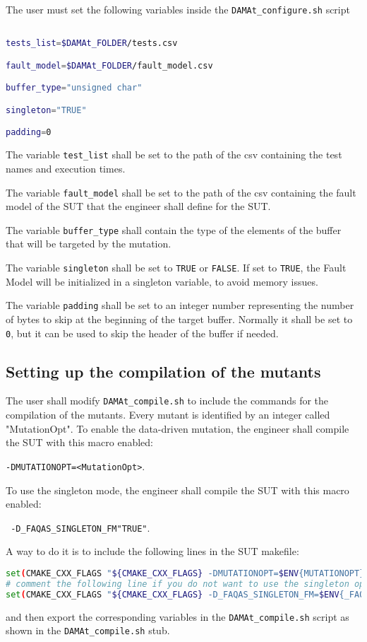 The user must set the following variables inside the \texttt{DAMAt\_configure.sh} script
\begin{lstlisting}[language=bash]

tests_list=$DAMAt_FOLDER/tests.csv

fault_model=$DAMAt_FOLDER/fault_model.csv

buffer_type="unsigned char"

singleton="TRUE"

padding=0

\end{lstlisting}

The variable \texttt{test\_list} shall be set to the path of the csv containing the test names and execution times.

The variable \texttt{fault\_model} shall be set to the path of the csv containing the fault model of the SUT that the engineer shall define for the SUT.

The variable \texttt{buffer\_type} shall contain the type of the elements of the buffer that will be targeted by the mutation.

The variable \texttt{singleton} shall be set to \texttt{TRUE} or \texttt{FALSE}. If set to \texttt{TRUE}, the Fault Model will be initialized in a singleton variable, to avoid memory issues.

The variable \texttt{padding} shall be set to an integer number representing the number of bytes to skip at the beginning of the target buffer. Normally it shall be set to \texttt{0}, but it can be used to skip the header of the buffer if needed.

\subsection{Setting up the compilation of the mutants}

The user shall modify \texttt{DAMAt\_compile.sh} to include the commands for the compilation of the mutants.
Every mutant is identified by an integer called "MutationOpt".
To enable the data-driven mutation, the engineer shall compile the SUT with this macro enabled:

\texttt{-DMUTATIONOPT=<MutationOpt>}.

To use the singleton mode, the engineer shall compile the SUT with this macro enabled:

 \texttt{ -D\_FAQAS\_SINGLETON\_FM\="TRUE"}.

A way to do it is to include the following lines in the SUT makefile:
\begin{lstlisting}[language=bash]
set(CMAKE_CXX_FLAGS "${CMAKE_CXX_FLAGS} -DMUTATIONOPT=$ENV{MUTATIONOPT}")
# comment the following line if you do not want to use the singleton option.
set(CMAKE_CXX_FLAGS "${CMAKE_CXX_FLAGS} -D_FAQAS_SINGLETON_FM=$ENV{_FAQAS_SINGLETON_FM}")
\end{lstlisting}
and then export the corresponding variables in the \texttt{DAMAt\_compile.sh} script as shown in the \texttt{DAMAt\_compile.sh} stub.


